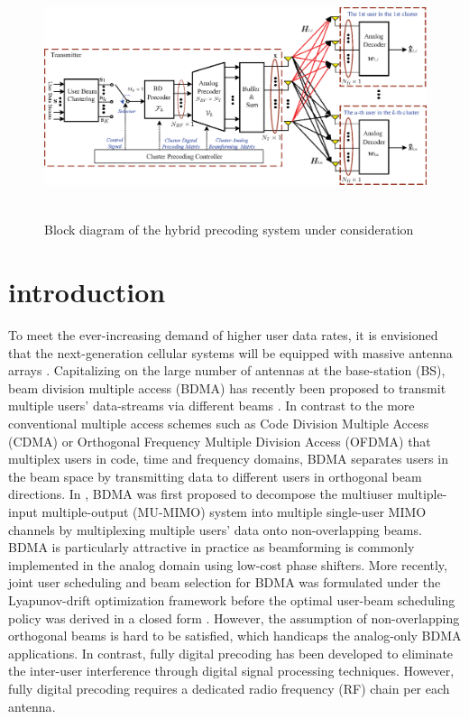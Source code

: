 \documentclass[conference]{IEEEtran}
\begin{document}
\begin{figure}[t]
\centering
\begin{minipage}[t]{0.7\linewidth}
	\includegraphics[height=2.8in,width=5.6in]{PPTFigure/BlockDiagonal.eps}
	\caption{Block diagram of the hybrid precoding system under consideration}\label{fig:BlockDiagram}
\end{minipage}
\end{figure}

\section{introduction}
To meet the ever-increasing demand of higher user data rates, it is envisioned that the next-generation cellular systems will be equipped with massive antenna arrays \cite{boccardi2014five}. Capitalizing on the large number of antennas at the base-station (BS), beam division multiple access (BDMA) has recently been proposed to transmit multiple users' data-streams via different beams \cite{sun2015beam, Jiang2018}. In contrast to the more conventional multiple access schemes such as Code Division Multiple Access (CDMA) or Orthogonal Frequency Multiple Division Access (OFDMA) that multiplex users in code, time and frequency domains, BDMA separates users in the beam space by transmitting data to different users in orthogonal beam directions. In \cite{sun2015beam}, BDMA was first proposed to decompose the multiuser multiple-input multiple-output (MU-MIMO) system into multiple single-user MIMO channels by multiplexing multiple users' data onto non-overlapping beams. BDMA is particularly attractive in practice as beamforming is commonly implemented in the analog domain using low-cost phase shifters. More recently, joint user scheduling and beam selection for BDMA was formulated under the Lyapunov-drift optimization framework before the optimal user-beam scheduling policy was derived in a closed form \cite{Jiang2018}. However, the assumption of non-overlapping orthogonal beams is hard to be satisfied, which handicaps the analog-only BDMA applications. In contrast, fully digital precoding has been developed to eliminate the inter-user interference through digital signal processing techniques. However, fully digital precoding requires a dedicated radio frequency (RF) chain per each antenna\cite{bogale2014beamforming}.
\end{document}
